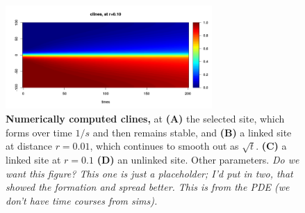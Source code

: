 \documentclass[12pt,titlepage]{article}
\newcommand{\plr}[1]{{\em \color{blue} #1}}
\begin{document}
\setcounter{table}{0}
\renewcommand{\thetable}{S\arabic{table}}
\setcounter{figure}{0}
\renewcommand{\thefigure}{S\arabic{figure}}



\begin{figure}
    \begin{center}
       \includegraphics[width=0.7\textwidth]{figs/example_cline}
    \end{center}
    \caption{
        \textbf{Numerically computed clines,} at
        \textbf{(A)} the selected site, which forms over time $1/s$ and then remains stable, and
        \textbf{(B)} a linked site at distance $r=0.01$, which continues to smooth out as $\sqrt{t}$.
        \textbf{(C)} a linked site at $r=0.1$
        \textbf{(D)} an unlinked site.
        Other parameters.
       \plr{Do we want this figure? This one is just a placeholder; I'd put in two, that showed the formation and spread better.
       This is from the PDE (we don't have time courses from sims).}
        \label{fig:pde_clines}
    }
\end{figure}
\end{document}
